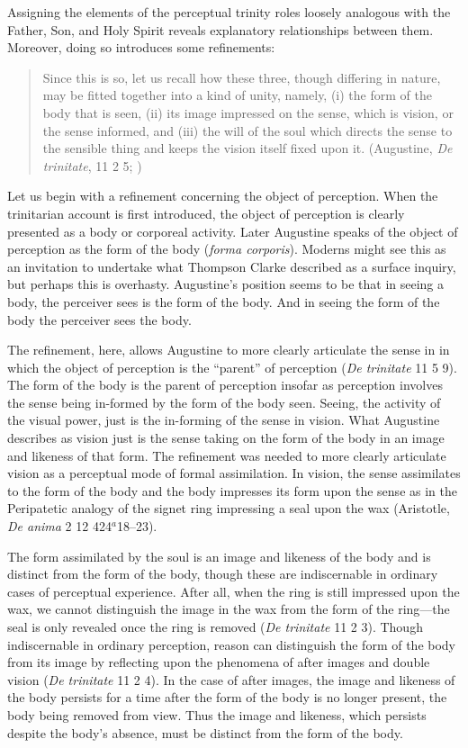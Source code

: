 \documentclass[12pt]{article}
\begin{document}
Assigning the elements of the perceptual trinity roles loosely analogous with the Father, Son, and Holy Spirit reveals explanatory relationships between them. Moreover, doing so introduces some refinements:
\begin{quote}
	Since this is so, let us recall how these three, though differing in nature, may be fitted together into a kind of unity, namely, (i) the form of the body that is seen, (ii) its image impressed on the sense, which is vision, or the sense informed, and (iii) the will of the soul which directs the sense to the sensible thing and keeps the vision itself fixed upon it. (Augustine, \emph{De trinitate}, 11 2 5; \citealt[65]{Matthews:2002ly})
\end{quote}

Let us begin with a refinement concerning the object of perception. When the trinitarian account is first introduced, the object of perception is clearly presented as a body or corporeal activity. Later Augustine speaks of the object of perception as the form of the body (\emph{forma corporis}). Moderns might see this as an invitation to undertake what Thompson Clarke described as a surface inquiry, but perhaps this is overhasty. Augustine's position seems to be that in seeing a body, the perceiver sees is the form of the body. And in seeing the form of the body the perceiver sees the body. 

The refinement, here, allows Augustine to more clearly articulate the sense in in which the object of perception is the ``parent'' of perception (\emph{De trinitate} 11 5 9). The form of the body is the parent of perception insofar as perception involves the sense being in-formed by the form of the body seen. Seeing, the activity of the visual power, just is the in-forming of the sense in vision. What Augustine describes as vision just is the sense taking on the form of the body in an image and likeness of that form. The refinement was needed to more clearly articulate vision as a perceptual mode of formal assimilation. In vision, the sense assimilates to the form of the body and the body impresses its form upon the sense as in the Peripatetic analogy of the signet ring impressing a seal upon the wax (Aristotle, \emph{De anima} 2 12 424\( ^{a} \)18–23). 

The form assimilated by the soul is an image and likeness of the body and is distinct from the form of the body, though these are indiscernable in ordinary cases of perceptual experience. After all, when the ring is still impressed upon the wax, we cannot distinguish the image in the wax from the form of the ring---the seal is only revealed once the ring is removed (\emph{De trinitate} 11 2 3). Though indiscernable in ordinary perception, reason can distinguish the form of the body from its image by reflecting upon the phenomena of after images and double vision (\emph{De trinitate} 11 2 4). In the case of after images, the image and likeness of the body persists for a time after the form of the body is no longer present, the body being removed from view. Thus the image and likeness, which persists despite the body's absence, must be distinct from the form of the body.
\end{document}
